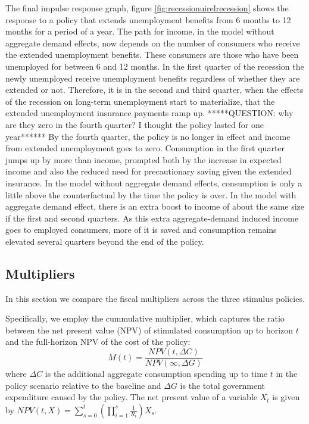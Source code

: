 \documentclass[../HAFiscal]{subfiles}
\begin{document}
The final impulse response graph, figure \ref{fig:recessionuirelrecession} shows the response to a policy that extends unemployment benefits from 6 months to 12 months for a period of a year. The path for income, in the model without aggregate demand effects, now depends on the number of consumers who receive the extended unemployment benefits. These consumers are those who have been unemployed for between 6 and 12 months. In the first quarter of the recession the newly unemployed receive unemployment benefits regardless of whether they are extended or not. Therefore, it is in the second and third quarter, when the effects of the recession on long-term unemployment start to materialize, that the extended unemployment insurance payments ramp up. *****QUESTION: why are they zero in the fourth quarter? I thought the policy lasted for one year****** By the fourth quarter, the policy is no longer in effect and income from extended unemployment goes to zero. Consumption in the first quarter jumps up by more than income, prompted both by the increase in expected income and also the reduced need for precautionary saving given the extended insurance. In the model without aggregate demand effects, consumption is only a little above the counterfactual by the time the policy is over. In the model with aggregate demand effect, there is an extra boost to income of about the same size if the first and second quarters. As this extra aggregate-demand induced income goes to employed consumers, more of it is saved and consumption remains elevated several quarters beyond the end of the policy.



\FloatBarrier
\subsection{Multipliers}

In this section we compare the fiscal multipliers across the three stimulus policies. 

Specifically, we employ the cummulative multiplier, which captures the ratio between the net present value (NPV) of stimulated consumption up to horizon $t$ and the full-horizon NPV of the cost of the policy:
\begin{equation*}
M(t) = \frac{NPV(t,\Delta C)}{NPV (\infty,\Delta G)}
\end{equation*}
where $\Delta C$ is the additional aggregate consumption spending up to time $t$ in the policy scenario relative to the baseline and $\Delta G$ is the total government expenditure caused by the policy. The net present value of a variable $X_t$ is given by 
$NPV(t,X) = \sum_{s=0}^{t} \left( \prod_{i=1}^{s} \frac{1}{R_i} \right) X_s$. 
\end{document}
